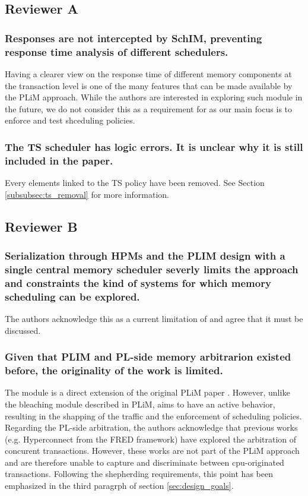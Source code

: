     \subsection{Reviewer A}
        \subsubsection{Responses are not intercepted by SchIM, preventing response time analysis of different schedulers.}
            Having a clearer view on the response time of different memory components at the transaction level is one of the many features that can be made available by the PLiM approach. While the authors are interested in exploring such module in the future, we do not consider this as a requirement for \schim as our main focus is to enforce and test shceduling policies.

        \subsubsection{The TS scheduler has logic errors. It is unclear why it is still included in the paper.}
            Every elements linked to the TS policy have been removed. See Section \ref{subsubsec:ts_removal} for more information.

    \subsection{Reviewer B}
        \subsubsection{Serialization through HPMs and the PLIM design with a single central memory scheduler severly limits the approach and constraints the kind of systems for which memory scheduling can be explored.}
            The authors acknowledge this as a current limitation of \schim and agree that it must be discussed.

        \subsubsection{Given that PLIM and PL-side memory arbitrarion existed before, the originality of the work is limited.}
            The \schim module is a direct extension of the original PLiM paper \cite{PLIM20}. However, unlike the bleaching module described in PLiM, \schim aims to have an active behavior, resulting in the shapping of the traffic and the enforcement of scheduling policies.
            Regarding the PL-side arbitration, the authors acknowledge that previous works (e.g. Hyperconnect from the FRED framework) have explored the arbitration of concurent transactions. However, these works are not part of the PLiM approach and are therefore unable to capture and discriminate between cpu-originated transactions.
            Following the shepherding requirements, this point has been emphasized in the third paragrph of section \ref{sec:design_goals}.

